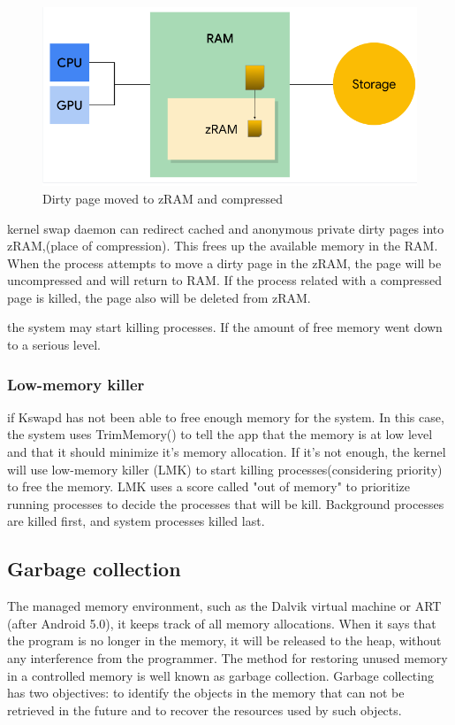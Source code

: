 \documentclass[preprint,12pt]{elsarticle}
\begin{document}
\begin{figure}[h]
    \centering
    \includegraphics[scale=0.4]{ram2.png}
    \caption{Dirty page moved to zRAM and compressed}
   
\end{figure}
kernel swap daemon can redirect cached and anonymous private dirty pages into zRAM,(place of compression). This frees up the available memory in the RAM. When the process attempts to move a dirty page in the zRAM, the page will be uncompressed and will return to RAM. If the process related with a compressed page is killed, the page also will be deleted from zRAM. 

the system may start killing processes. If the amount of free memory went down to a serious level.
    
 \subsubsection{Low-memory killer} 

if Kswapd has not been able to free enough memory for the system. In this case, the system uses TrimMemory() to tell the app that the memory is at low level and that it should minimize it's memory allocation. If it's not enough, the kernel will use low-memory killer (LMK) to start killing processes(considering priority) to free the memory.
LMK uses a score called "out of memory" to prioritize running processes to decide the processes that will be kill. Background processes are killed first, and system processes killed last.

\subsection{Garbage collection} 
The managed memory environment, such as the Dalvik virtual machine or ART (after Android 5.0), it keeps track of all memory allocations. When it says that the program is no longer in the memory, it will be released to the heap, without any interference from the programmer. The method for restoring unused memory in a controlled memory is well known as garbage collection. Garbage collecting has two objectives: to identify the objects in the memory that can not be retrieved in the future and to recover the resources used by such objects. \\
\end{document}
